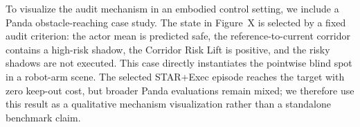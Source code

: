 To visualize the audit mechanism in an embodied control setting, we include a Panda obstacle-reaching case study. The state in Figure~X is selected by a fixed audit criterion: the actor mean is predicted safe, the reference-to-current corridor contains a high-risk shadow, the Corridor Risk Lift is positive, and the risky shadows are not executed. This case directly instantiates the pointwise blind spot in a robot-arm scene. The selected STAR+Exec episode reaches the target with zero keep-out cost, but broader Panda evaluations remain mixed; we therefore use this result as a qualitative mechanism visualization rather than a standalone benchmark claim.
